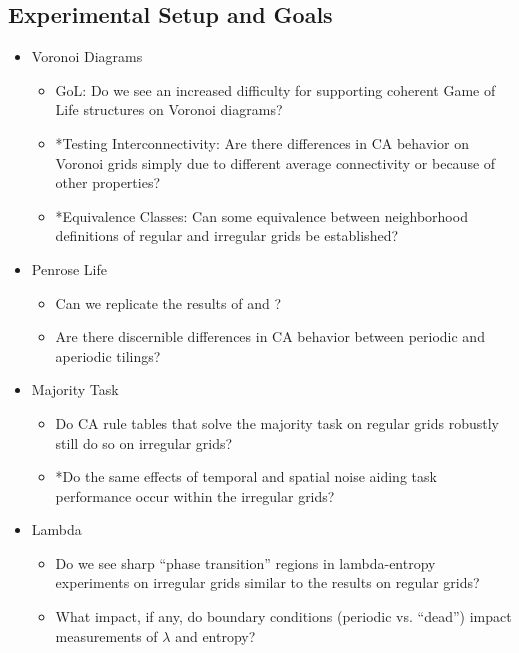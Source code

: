 \documentclass[a4paper, 11pt]{article}
\begin{document}
\subsection*{Experimental Setup and Goals}
\begin{itemize}

\item Voronoi Diagrams
\begin{itemize}
\item GoL: Do we see an increased difficulty for supporting coherent Game of Life structures on Voronoi diagrams?
\item *Testing Interconnectivity: Are there differences in CA behavior on Voronoi grids simply due to different average connectivity or because of other properties?
\item *Equivalence Classes: Can some equivalence between neighborhood definitions of regular and irregular grids be established?
\end{itemize}

\item Penrose Life
\begin{itemize}
\item Can we replicate the results of \citeauthor{hi05} and \citeauthor{ow10}?
\item Are there discernible differences in CA behavior between periodic and aperiodic tilings?
\end{itemize}

\item Majority Task
\begin{itemize}
\item Do CA rule tables that solve the majority task on regular grids robustly still do so on irregular grids?
\item *Do the same effects of temporal and spatial noise \citeauthor{me07} aiding task performance occur within the irregular grids?
\end{itemize}

\item Lambda 
\begin{itemize}
\item Do we see sharp ``phase transition'' regions in lambda-entropy experiments on irregular grids similar to the results on regular grids?

\item What impact, if any, do boundary conditions (periodic vs. ``dead'') impact measurements of $\lambda$ and entropy?
\end{itemize}

\end{itemize}
\end{document}
